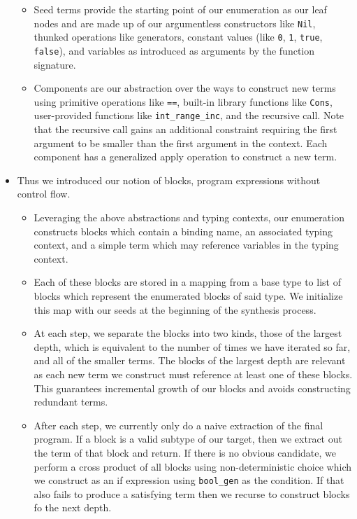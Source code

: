 \documentclass[review, sigplan]{acmart}
\begin{document}
\begin{itemize}
          \begin{itemize}
              \item Seed terms provide the starting point of our enumeration as our leaf nodes and are made up of our argumentless constructors like \texttt{Nil}, thunked operations like generators, constant values (like \texttt{0}, \texttt{1}, \texttt{true}, \texttt{false}), and variables as introduced as arguments by the function signature.
              \item Components are our abstraction over the ways to construct new terms using primitive operations like \texttt{==}, built-in library functions like \texttt{Cons}, user-provided functions like \texttt{int\_range\_inc}, and the recursive call. Note that the recursive call gains an additional constraint requiring the first argument to be smaller than the first argument in the context. Each component has a generalized apply operation to construct a new term.
          \end{itemize}
    \item Thus we introduced our notion of blocks, program expressions without control flow.
          \begin{itemize}
              \item Leveraging the above abstractions and typing contexts,
                    our enumeration constructs blocks which contain a binding name,
                    an associated typing context, and a simple term which may
                    reference variables in the typing context.
              \item Each of these blocks are stored in a mapping from a base type
                    to list of blocks which represent the enumerated blocks of
                    said type.
                    We initialize this map with our seeds at the beginning of the synthesis process.
              \item At each step, we separate the blocks into two kinds, those
                    of the largest depth, which is equivalent to the number of times
                    we have iterated so far, and all of the smaller terms.
                    The blocks of the largest depth are relevant as each new term we
                    construct must reference at least one of these blocks.
                    This guarantees incremental growth of our blocks and avoids constructing redundant terms.
              \item After each step, we currently only do a naive extraction of the
                    final program.
                    If a block is a valid subtype of our target, then we extract out
                    the term of that block and return.
                    If there is no obvious candidate, we perform a cross product of
                    all blocks using non-deterministic choice which we construct as
                    an if expression using \texttt{bool\_gen} as the condition.
                    If that also fails to produce a satisfying term then we
                    recurse to construct blocks fo the next depth.
          \end{itemize}

\end{itemize}
\end{document}
